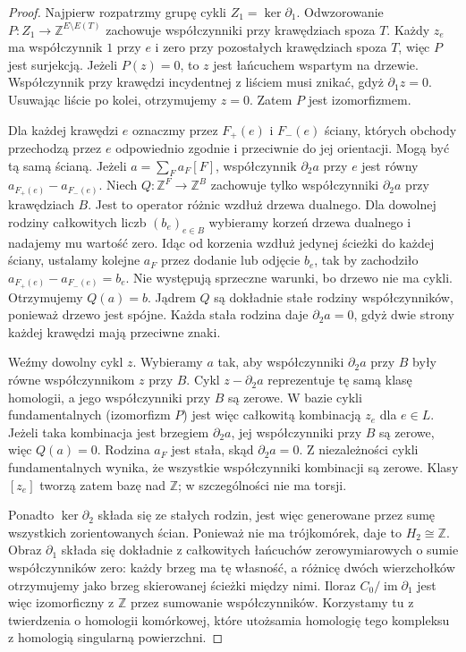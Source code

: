 \begin{proof}
Najpierw rozpatrzmy grupę cykli $Z_1=\ker\partial_1$.
Odwzorowanie $P:Z_1\to\mathbb Z^{E\setminus E(T)}$
zachowuje współczynniki przy krawędziach spoza $T$.
Każdy $z_e$ ma współczynnik $1$ przy $e$ i zero
przy pozostałych krawędziach spoza $T$, więc $P$
jest surjekcją. Jeżeli $P(z)=0$, to $z$ jest
łańcuchem wspartym na drzewie. Współczynnik
przy krawędzi incydentnej z liściem musi znikać,
gdyż $\partial_1z=0$. Usuwając liście po kolei,
otrzymujemy $z=0$. Zatem $P$ jest izomorfizmem.

Dla każdej krawędzi $e$ oznaczmy przez $F_+(e)$
i $F_-(e)$ ściany, których obchody przechodzą
przez $e$ odpowiednio zgodnie i przeciwnie
do jej orientacji. Mogą być tą samą ścianą.
Jeżeli $a=\sum_F a_F[F]$, współczynnik
$\partial_2 a$ przy $e$ jest równy
$a_{F_+(e)}-a_{F_-(e)}$. Niech
$Q:\mathbb Z^F\to\mathbb Z^B$ zachowuje tylko
współczynniki $\partial_2a$ przy krawędziach $B$.
Jest to operator różnic wzdłuż drzewa dualnego.
Dla dowolnej rodziny całkowitych liczb $(b_e)_{e\in B}$
wybieramy korzeń drzewa dualnego i nadajemy mu
wartość zero. Idąc od korzenia wzdłuż jedynej
ścieżki do każdej ściany, ustalamy kolejne $a_F$
przez dodanie lub odjęcie $b_e$, tak by zachodziło
$a_{F_+(e)}-a_{F_-(e)}=b_e$.
Nie występują sprzeczne warunki, bo drzewo
nie ma cykli. Otrzymujemy $Q(a)=b$.
Jądrem $Q$ są dokładnie stałe rodziny
współczynników, ponieważ drzewo jest spójne.
Każda stała rodzina daje $\partial_2 a=0$,
gdyż dwie strony każdej krawędzi mają
przeciwne znaki.

Weźmy dowolny cykl $z$. Wybieramy $a$ tak,
aby współczynniki $\partial_2a$ przy $B$
były równe współczynnikom $z$ przy $B$.
Cykl $z-\partial_2a$ reprezentuje tę samą klasę
homologii, a jego współczynniki przy $B$ są zerowe.
W bazie cykli fundamentalnych (izomorfizm $P$)
jest więc całkowitą kombinacją $z_e$ dla $e\in L$.
Jeżeli taka kombinacja jest brzegiem $\partial_2a$,
jej współczynniki przy $B$ są zerowe, więc $Q(a)=0$.
Rodzina $a_F$ jest stała, skąd $\partial_2a=0$.
Z niezależności cykli fundamentalnych wynika,
że wszystkie współczynniki kombinacji są zerowe.
Klasy $[z_e]$ tworzą zatem bazę nad $\mathbb Z$;
w szczególności nie ma torsji.

Ponadto $\ker\partial_2$ składa się ze stałych
rodzin, jest więc generowane przez sumę
wszystkich zorientowanych ścian. Ponieważ nie
ma trójkomórek, daje to $H_2\cong\mathbb Z$.
Obraz $\partial_1$ składa się dokładnie
z całkowitych łańcuchów zerowymiarowych o sumie
współczynników zero: każdy brzeg ma tę własność,
a różnicę dwóch wierzchołków otrzymujemy jako
brzeg skierowanej ścieżki między nimi.
Iloraz $C_0/\operatorname{im}\partial_1$
jest więc izomorficzny z $\mathbb Z$ przez
sumowanie współczynników. Korzystamy tu z twierdzenia
o homologii komórkowej, które utożsamia homologię
tego kompleksu z homologią singularną powierzchni.
\end{proof}

